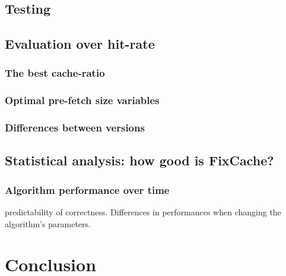 \documentclass[12pt,twoside,notitlepage]{report}
\begin{document}
\section{Testing}
\section{Evaluation over hit-rate}
\subsection{The best cache-ratio}
\subsection{Optimal pre-fetch size variables}
\subsection{Differences between versions}
\section{Statistical analysis: how good is FixCache?}
\subsection{Algorithm performance over time} predictability of correctness. Differences in performances when changing the algorithm's parameters. 

\cleardoublepage
\chapter{Conclusion}

\cleardoublepage



\cleardoublepage

\appendix
\end{document}
